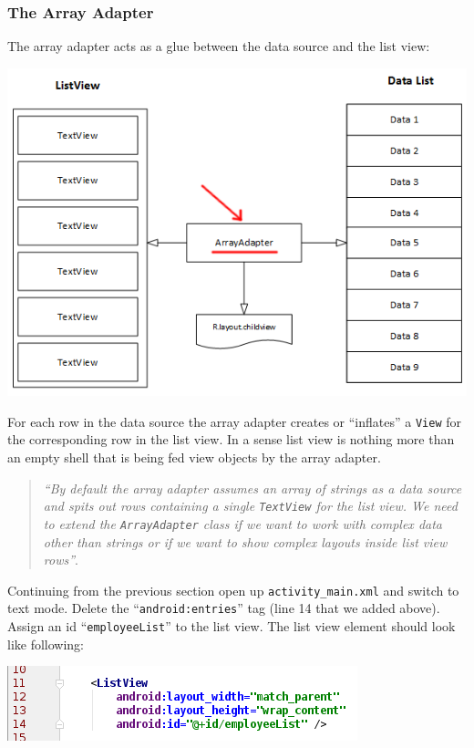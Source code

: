\subsubsection{The Array Adapter}
The array adapter acts as a glue between the data source and the list view:

\begin{center}
	\includegraphics[scale=0.4]{chapters/ch10/images/6}
\end{center}

For each row in the data source the array adapter creates or ``inflates'' a \texttt{View} for the corresponding row in the list view. In a sense list view is nothing more than an empty shell that is being fed view objects by the array adapter. 

\begin{quote}
	\textit{``By default the array adapter assumes an array of strings as a data source and spits out rows containing a single \texttt{TextView} for the list view. We need to extend the \texttt{ArrayAdapter} class if we want to work with complex data other than strings or if we want to show complex layouts inside list view rows''}.
\end{quote}

Continuing from the previous section open up \texttt{activity\_main.xml} and switch to text mode. Delete the ``\texttt{android:entries}'' tag (line 14 that we added above). Assign an id ``\texttt{employeeList}'' to the list view. The list view element should look like following:

\begin{center}
	\includegraphics[scale=0.4]{chapters/ch10/images/7}
\end{center}

